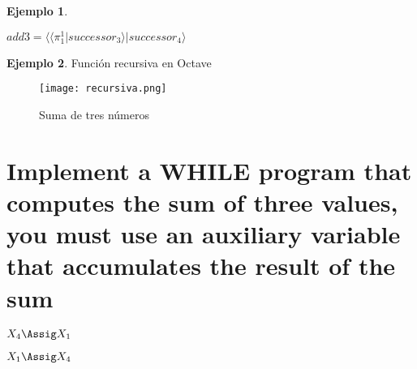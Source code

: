 \documentclass{article}
\theoremstyle{plain}
\theoremstyle{definition}
\newtheorem{example}{Ejemplo}[section]
\begin{document}
\begin{example}
\begin{center}
$add3 = \langle \langle \pi^1_1 | successor_3 \rangle | successor_4 \rangle $
\end{center}
\end{example}

\newpage
\begin{example}
Función recursiva en Octave
\begin{figure}
    \centering
    \texttt{[image: recursiva.png]}
    \caption{Suma de tres números}
    \label{fig:my_label}
\end{figure}
\end{example}

\newpage
\section{Implement a WHILE program that computes the sum of three values, you must use an auxiliary variable that accumulates the result of the sum}

\begin{whilecode}[H]
$X_4\Assig X_1$\;
 
 
 $X_1\Assig X_4$\;

\end{whilecode}
\end{document}
